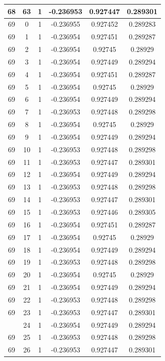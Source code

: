 \documentclass[12pt,a4paper]{article}
\numberwithin{equation}{section}
\numberwithin{figure}{section}
\numberwithin{table}{section}
\begin{document}
\begin{longtable}{|c|c|c|c|c|c|}
68 & 63 & 1 & -0.236953 & 0.927447 & 0.289301 \\ \hline
69 & 0 & 1 & -0.236955 & 0.927452 & 0.289283 \\ \hline
69 & 1 & 1 & -0.236954 & 0.927451 & 0.289287 \\ \hline
69 & 2 & 1 & -0.236954 & 0.92745 & 0.28929 \\ \hline
69 & 3 & 1 & -0.236954 & 0.927449 & 0.289294 \\ \hline
69 & 4 & 1 & -0.236954 & 0.927451 & 0.289287 \\ \hline
69 & 5 & 1 & -0.236954 & 0.92745 & 0.28929 \\ \hline
69 & 6 & 1 & -0.236954 & 0.927449 & 0.289294 \\ \hline
69 & 7 & 1 & -0.236953 & 0.927448 & 0.289298 \\ \hline
69 & 8 & 1 & -0.236954 & 0.92745 & 0.28929 \\ \hline
69 & 9 & 1 & -0.236954 & 0.927449 & 0.289294 \\ \hline
69 & 10 & 1 & -0.236953 & 0.927448 & 0.289298 \\ \hline
69 & 11 & 1 & -0.236953 & 0.927447 & 0.289301 \\ \hline
69 & 12 & 1 & -0.236954 & 0.927449 & 0.289294 \\ \hline
69 & 13 & 1 & -0.236953 & 0.927448 & 0.289298 \\ \hline
69 & 14 & 1 & -0.236953 & 0.927447 & 0.289301 \\ \hline
69 & 15 & 1 & -0.236953 & 0.927446 & 0.289305 \\ \hline
69 & 16 & 1 & -0.236954 & 0.927451 & 0.289287 \\ \hline
69 & 17 & 1 & -0.236954 & 0.92745 & 0.28929 \\ \hline
69 & 18 & 1 & -0.236954 & 0.927449 & 0.289294 \\ \hline
69 & 19 & 1 & -0.236953 & 0.927448 & 0.289298 \\ \hline
69 & 20 & 1 & -0.236954 & 0.92745 & 0.28929 \\ \hline
69 & 21 & 1 & -0.236954 & 0.927449 & 0.289294 \\ \hline
69 & 22 & 1 & -0.236953 & 0.927448 & 0.289298 \\ \hline
69 & 23 & 1 & -0.236953 & 0.927447 & 0.289301 \\ \hline
\pagebreak
69 & 24 & 1 & -0.236954 & 0.927449 & 0.289294 \\ \hline
69 & 25 & 1 & -0.236953 & 0.927448 & 0.289298 \\ \hline
69 & 26 & 1 & -0.236953 & 0.927447 & 0.289301 \\ \hline

\end{longtable}
\end{document}
